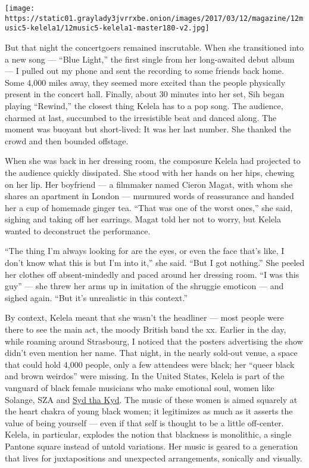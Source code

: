 \texttt{[image: https://static01.graylady3jvrrxbe.onion/images/2017/03/12/magazine/12music5-kelela1/12music5-kelela1-master180-v2.jpg]}

But that night the concertgoers remained inscrutable. When she
transitioned into a new song --- ``Blue Light,'' the first single from
her long-awaited debut album --- I pulled out my phone and sent the
recording to some friends back home. Some 4,000 miles away, they seemed
more excited than the people physically present in the concert hall.
Finally, about 30 minutes into her set, Sih began playing ``Rewind,''
the closest thing Kelela has to a pop song. The audience, charmed at
last, succumbed to the irresistible beat and danced along. The moment
was buoyant but short-lived: It was her last number. She thanked the
crowd and then bounded offstage.

When she was back in her dressing room, the composure Kelela had
projected to the audience quickly dissipated. She stood with her hands
on her hips, chewing on her lip. Her boyfriend --- a filmmaker named
Cieron Magat, with whom she shares an apartment in London --- murmured
words of reassurance and handed her a cup of homemade ginger tea. ``That
was one of the worst ones,'' she said, sighing and taking off her
earrings. Magat told her not to worry, but Kelela wanted to deconstruct
the performance.

``The thing I'm always looking for are the eyes, or even the face that's
like, I don't know what this is but I'm into it,'' she said. ``But I got
nothing.'' She peeled her clothes off absent-mindedly and paced around
her dressing room. ``I was this guy'' --- she threw her arms up in
imitation of the shruggie emoticon --- and sighed again. ``But it's
unrealistic in this context.''

By context, Kelela meant that she wasn't the headliner --- most people
were there to see the main act, the moody British band the xx. Earlier
in the day, while roaming around Strasbourg, I noticed that the posters
advertising the show didn't even mention her name. That night, in the
nearly sold-out venue, a space that could hold 4,000 people, only a few
attendees were black; her ``queer black and brown weirdos'' were
missing. In the United States, Kelela is part of the vanguard of black
female musicians who make emotional soul, women like Solange, SZA and
\href{https://www.nytimes3xbfgragh.onion/interactive/2016/03/10/magazine/25-songs-that-tell-us-where-music-is-going.html\#/syd-tha-kyd-the-internet-get-away}{Syd
tha Kyd}. The music of these women is aimed squarely at the heart chakra
of young black women; it legitimizes as much as it asserts the value of
being yourself --- even if that self is thought to be a little
off-center. Kelela, in particular, explodes the notion that blackness is
monolithic, a single Pantone square instead of untold variations. Her
music is geared to a generation that lives for juxtapositions and
unexpected arrangements, sonically and visually.

